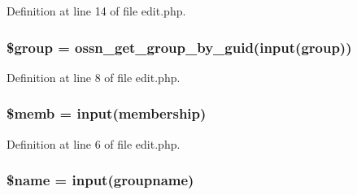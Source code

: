 Definition at line 14 of file edit.\+php.

\subsubsection[{\texorpdfstring{\$group}{$group}}]{\setlength{\rightskip}{0pt plus 5cm}\$group = {\bf ossn\+\_\+get\+\_\+group\+\_\+by\+\_\+guid}({\bf input}(\textquotesingle{}group\textquotesingle{}))}\hypertarget{components_2_ossn_groups_2actions_2group_2edit_8php_ad530a85733b0ec1dc321859fd8faa0dc}{}\label{components_2_ossn_groups_2actions_2group_2edit_8php_ad530a85733b0ec1dc321859fd8faa0dc}


Definition at line 8 of file edit.\+php.

\subsubsection[{\texorpdfstring{\$memb}{$memb}}]{\setlength{\rightskip}{0pt plus 5cm}\$memb = {\bf input}(\textquotesingle{}membership\textquotesingle{})}\hypertarget{components_2_ossn_groups_2actions_2group_2edit_8php_ade7bbae76482367aaca422378935a52d}{}\label{components_2_ossn_groups_2actions_2group_2edit_8php_ade7bbae76482367aaca422378935a52d}


Definition at line 6 of file edit.\+php.

\subsubsection[{\texorpdfstring{\$name}{$name}}]{\setlength{\rightskip}{0pt plus 5cm}\${\bf name} = {\bf input}(\textquotesingle{}groupname\textquotesingle{})}\hypertarget{components_2_ossn_groups_2actions_2group_2edit_8php_ab2fc40d43824ea3e1ce5d86dee0d763b}{}\label{components_2_ossn_groups_2actions_2group_2edit_8php_ab2fc40d43824ea3e1ce5d86dee0d763b}


